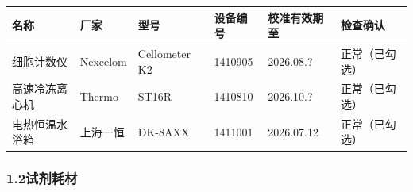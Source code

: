 \documentclass[UTF8,10pt,a4paper,fontset=fandol]{ctexart}
\newcommand{\fieldvalue}[1]{#1}
\newcommand{\handwritten}[1]{#1}
\begin{document}
\begin{tabularx}{\textwidth}{|X|X|X|X|X|X|}
\hline
名称 & 厂家 & 型号 & 设备编号 & 校准有效期至 & 检查确认\\
\hline
\fieldvalue{细胞计数仪}
&
\fieldvalue{Nexcelom}
&
\fieldvalue{Cellometer K2}
&
\fieldvalue{1410905}
&
\fieldvalue{\handwritten{2026.08.?}}
&
\fieldvalue{正常（已勾选）}\\
\hline
\fieldvalue{高速冷冻离心机}
&
\fieldvalue{Thermo}
&
\fieldvalue{ST16R}
&
\fieldvalue{1410810}
&
\fieldvalue{\handwritten{2026.10.?}}
&
\fieldvalue{正常（已勾选）}\\
\hline
\fieldvalue{电热恒温水浴箱}
&
\fieldvalue{上海一恒}
&
\fieldvalue{DK-8AXX}
&
\fieldvalue{1411001}
&
\fieldvalue{\handwritten{2026.07.12}}
&
\fieldvalue{正常（已勾选）}\\
\hline
\end{tabularx}

\subsubsection{1.2\quad 试剂耗材}
\end{document}
